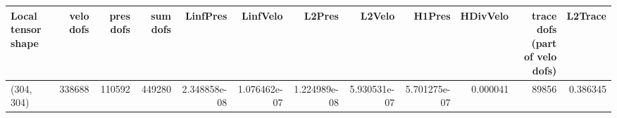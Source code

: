 \begin{tabular}{lrrrrrrrrrrr}
\toprule
Local tensor shape &  velo dofs &  pres dofs &  sum dofs &     LinfPres &     LinfVelo &       L2Pres &       L2Velo &       H1Pres &  HDivVelo &  trace dofs (part of velo dofs) &  L2Trace \\
\midrule
        (304, 304) &     338688 &     110592 &    449280 & 2.348858e-08 & 1.076462e-07 & 1.224989e-08 & 5.930531e-07 & 5.701275e-07 &  0.000041 &                           89856 & 0.386345 \\
\bottomrule
\end{tabular}
